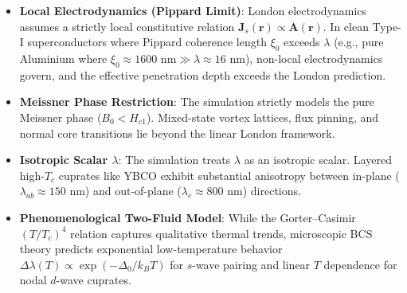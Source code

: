 \documentclass[11pt,a4paper]{article}
\begin{document}
\begin{itemize}
    \item \textbf{Local Electrodynamics (Pippard Limit)}: London electrodynamics assumes a strictly local constitutive relation $\mathbf{J}_s(\mathbf{r}) \propto \mathbf{A}(\mathbf{r})$. In clean Type-I superconductors where Pippard coherence length $\xi_0$ exceeds $\lambda$ (e.g., pure Aluminium where $\xi_0 \approx 1600\text{ nm} \gg \lambda \approx 16\text{ nm}$), non-local electrodynamics govern, and the effective penetration depth exceeds the London prediction.
    \item \textbf{Meissner Phase Restriction}: The simulation strictly models the pure Meissner phase ($B_0 < H_{c1}$). Mixed-state vortex lattices, flux pinning, and normal core transitions lie beyond the linear London framework.
    \item \textbf{Isotropic Scalar $\lambda$}: The simulation treats $\lambda$ as an isotropic scalar. Layered high-$T_c$ cuprates like YBCO exhibit substantial anisotropy between in-plane ($\lambda_{ab} \approx 150\text{ nm}$) and out-of-plane ($\lambda_c \approx 800\text{ nm}$) directions.
    \item \textbf{Phenomenological Two-Fluid Model}: While the Gorter--Casimir $(T/T_c)^4$ relation captures qualitative thermal trends, microscopic BCS theory predicts exponential low-temperature behavior $\Delta\lambda(T) \propto \exp(-\Delta_0 / k_B T)$ for $s$-wave pairing and linear $T$ dependence for nodal $d$-wave cuprates.
\end{itemize}
\end{document}
